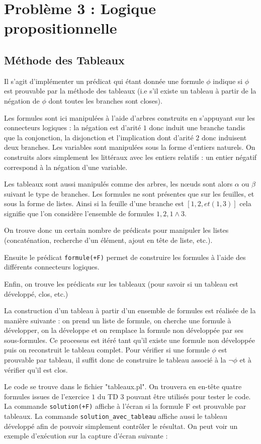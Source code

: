 \documentclass[12pt,a4paper]{article}
\begin{document}
\section{Problème 3 : Logique propositionnelle}
\subsection{Méthode des Tableaux}
Il s'agit d'implémenter un prédicat qui étant donnée une formule $\phi$ indique si $\phi$ est prouvable par la méthode des tableaux (i.e s'il existe un tableau à partir de la négation de $\phi$ dont toutes les branches sont closes).

Les formules sont ici manipulées à l'aide d'arbres construits en s'appuyant sur les connecteurs logiques : la négation est d'arité $1$ donc induit une branche tandis que la conjonction, la disjonction et l'implication dont d'arité $2$ donc induisent deux branches. Les variables sont manipulées sous la forme d'entiers naturels. On construits alors simplement les littéraux avec les entiers relatifs : un entier négatif correspond à la négation d'une variable.

Les tableaux sont aussi manipulés comme des arbres, les nœuds sont alors $\alpha$ ou $\beta$ suivant le type de branches. Les formules ne sont présentes que sur les feuilles, et sous la forme de listes. Ainsi si la feuille d'une branche est $[1,2,et(1,3)]$ cela signifie que l'on considère l'ensemble de formules ${1,2,1\wedge3}$.

On trouve donc un certain nombre de prédicats pour manipuler les listes (concaténation, recherche d'un élément, ajout en tête de liste, etc.).

Ensuite le prédicat \texttt{formule(+F)} permet de construire les formules à l'aide des différents connecteurs logiques.

Enfin, on trouve les prédicats sur les tableaux (pour savoir si un tableau est développé, clos, etc.)

La construction d'un tableau à partir d'un ensemble de formules est réalisée de la manière suivante : on prend un liste de formule, on cherche une formule à développer, on la développe et on remplace la formule non développée par ses sous-formules. Ce processus est itéré tant qu'il existe une formule non développée puis on reconstruit le tableau complet. 
Pour vérifier si une formule  $\phi$ est prouvable par tableau, il suffit donc de construire le tableau associé à la $\neg \phi$ et à vérifier qu'il est clos.

Le code se trouve dans le fichier "tableaux.pl". On trouvera en en-tête quatre formules issues de l'exercice $1$ du TD $3$ pouvant être utilisés pour tester le code. La commande \texttt{solution(+F)} affiche à l'écran si la formule F est prouvable par tableaux. La commande \texttt{solution\_avec\_tableau} affiche aussi le tableau développé afin de pouvoir simplement contrôler le résultat. On peut voir un exemple d'exécution sur la capture d'écran suivante : 
\end{document}

